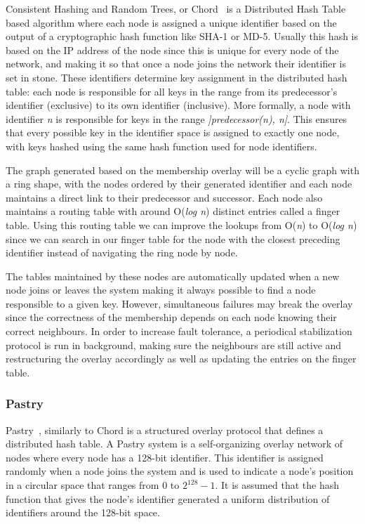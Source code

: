 Consistent Hashing and Random Trees, or Chord~\cite{chord} is a Distributed Hash
Table based algorithm where each node is assigned a unique identifier based on
the output of a cryptographic hash function like SHA-1 or MD-5. Usually this hash is based on the IP address of
the node since this is unique for every node of the network, and making it so
that once a node joins the network their identifier is set in stone. These
identifiers determine key assignment in the distributed hash table: each node is responsible
for all keys in the range from its predecessor's identifier (exclusive) to its own identifier (inclusive).
More formally, a node with identifier \textit{n} is responsible for keys in the range \textit{]predecessor(n), n]}.
This ensures that every possible key in the identifier space is assigned to exactly one node,
with keys hashed using the same hash function used for node identifiers.

The graph generated based on the membership overlay will be a cyclic graph with
a ring shape, with the nodes ordered by their generated identifier and each node maintains a direct link
to their predecessor and successor. Each node
also maintains a routing table with around O(\textit{log n}) distinct entries
called a finger table. Using this routing table we can improve the lookups from O(\textit{n}) to O(\textit{log n})
since we can search in our finger table for the node with the closest preceding identifier instead of
navigating the ring node by node.

The tables maintained by these nodes are automatically updated when a new node joins
or leaves the system  making it always possible to find a node responsible to a given
key. However, simultaneous failures may break the overlay since the correctness
of the membership depends on each node knowing their correct neighbours. In order
to increase fault tolerance, a periodical stabilization protocol is run in background,
making sure the neighbours are still active and restructuring the overlay
accordingly as well as updating the entries on the finger table.

\subsubsection{Pastry}\label{subsec:pastry}

Pastry~\cite{pastry}, similarly to Chord is a structured overlay protocol that
defines a distributed hash table. A Pastry system is a self-organizing overlay
network of nodes where every node has a 128-bit identifier. This identifier
is assigned randomly when a node joins the system and is used to indicate a
node's position in a circular space that ranges from 0 to $2^{128}-1$. It is assumed
that the hash function that gives the node's identifier generated a uniform
distribution of identifiers around the 128-bit space.

